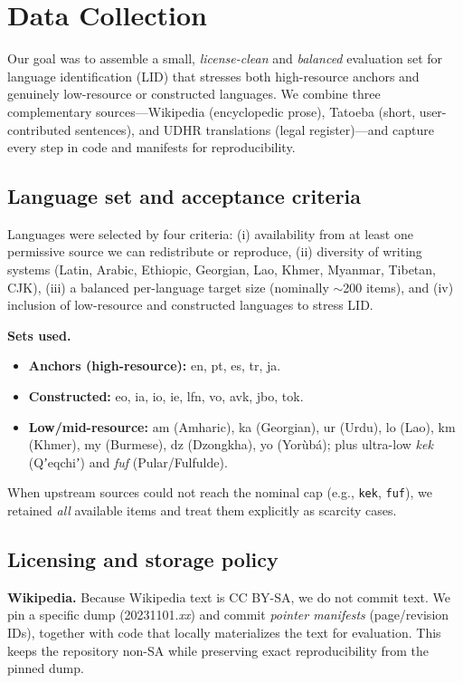 \section{Data Collection}
\label{sec:data-collection}

Our goal was to assemble a small, \emph{license-clean} and \emph{balanced} evaluation set for language identification (LID) that stresses both high-resource anchors and genuinely low-resource or constructed languages. We combine three complementary sources—Wikipedia (encyclopedic prose), Tatoeba (short, user-contributed sentences), and UDHR translations (legal register)—and capture every step in code and manifests for reproducibility.

\subsection{Language set and acceptance criteria}
Languages were selected by four criteria: (i) availability from at least one permissive source we can redistribute or reproduce, (ii) diversity of writing systems (Latin, Arabic, Ethiopic, Georgian, Lao, Khmer, Myanmar, Tibetan, CJK), (iii) a balanced per-language target size (nominally $\sim$200 items), and (iv) inclusion of low-resource and constructed languages to stress LID.

\noindent\textbf{Sets used.}
\begin{itemize}
  \item \textbf{Anchors (high-resource):} en, pt, es, tr, ja.
  \item \textbf{Constructed:} eo, ia, io, ie, lfn, vo, avk, jbo, tok.
  \item \textbf{Low/mid-resource:} am (Amharic), ka (Georgian), ur (Urdu), lo (Lao), km (Khmer), my (Burmese), dz (Dzongkha), yo (Yorùbá); plus ultra-low \emph{kek} (Qʼeqchiʼ) and \emph{fuf} (Pular/Fulfulde).
\end{itemize}
When upstream sources could not reach the nominal cap (e.g., \texttt{kek}, \texttt{fuf}), we retained \emph{all} available items and treat them explicitly as scarcity cases.

\subsection{Licensing and storage policy}
\textbf{Wikipedia.} Because Wikipedia text is CC BY-SA, we do not commit text. We pin a specific dump (20231101.\textit{xx}) and commit \emph{pointer manifests} (page/revision IDs), together with code that locally materializes the text for evaluation. This keeps the repository non-SA while preserving exact reproducibility from the pinned dump.

